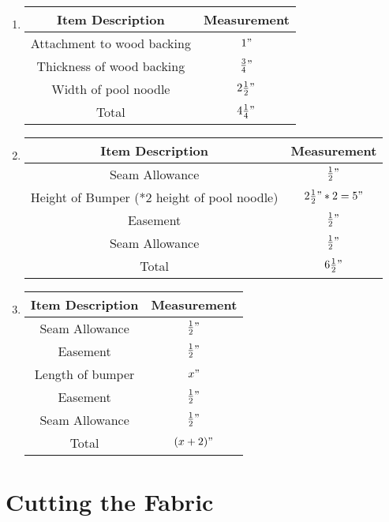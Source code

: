 \documentclass[
10pt, %
a4paper, %
oneside, %
headinclude,footinclude, %
BCOR5mm, %
]{scrartcl}
\begin{document}
\begin{enumerate}[label=\Alph*]
	\item %
	\begin{tabular}{|c|c|}
		\hline
		Item Description & Measurement \\ \hline
		Attachment to wood backing & $1"$ \\ \hline
		Thickness of wood backing & $\frac{3}{4}"$ \\ \hline
		Width of pool noodle & $2\frac{1}{2}"$ \\ \hline
		Total & $4\frac{1}{4}"$ \\ \hline
	\end{tabular}
	
	\item %
	\begin{tabular}{|c|c|}
		\hline
		Item Description & Measurement \\ \hline
		Seam Allowance & $\frac{1}{2}"$ \\ \hline
		Height of Bumper (*2 height of pool noodle) & $2\frac{1}{2}" * 2 = 5"$ \\ \hline
		Easement & $\frac{1}{2}"$ \\ \hline
		Seam Allowance & $\frac{1}{2}"$ \\ \hline
		Total & $6\frac{1}{2}"$ \\ \hline
	\end{tabular}
	
	\item %
	\begin{tabular}{|c|c|}
		\hline
		Item Description & Measurement \\ \hline
		Seam Allowance & $\frac{1}{2}"$ \\ \hline
		Easement & $\frac{1}{2}"$ \\ \hline
		Length of bumper & $x"$ \\ \hline
		Easement & $\frac{1}{2}"$ \\ \hline
		Seam Allowance & $\frac{1}{2}"$ \\ \hline
		Total & $(x + 2)"$ \\ \hline
	\end{tabular}
\end{enumerate}


\section{Cutting the Fabric}
\end{document}
